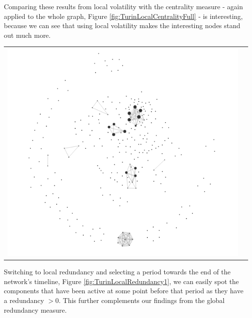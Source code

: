 \begin{center}
\end{center}
Comparing these results from local volatility with the centrality measure - again applied to the whole graph, Figure \ref{fig:TurinLocalCentralityFull} - is interesting, because we can see that using local volatility makes the interesting nodes stand out much more. 
\begin{center}
\begin{tabular}{cc}
\includegraphics[trim={0 0 0 0}, width=140mm]{./Figures/TurinLocalRedundancy1.png}
\end{tabular}
\label{fig:TurinLocalRedundancy1}
\end{center}
Switching to local redundancy and selecting a period towards the end of the network's timeline, Figure \ref{fig:TurinLocalRedundancy1}, we can easily spot the components that have been active at some point before that period as they have a redundancy $> 0$. This further complements our findings from the global redundancy measure.

